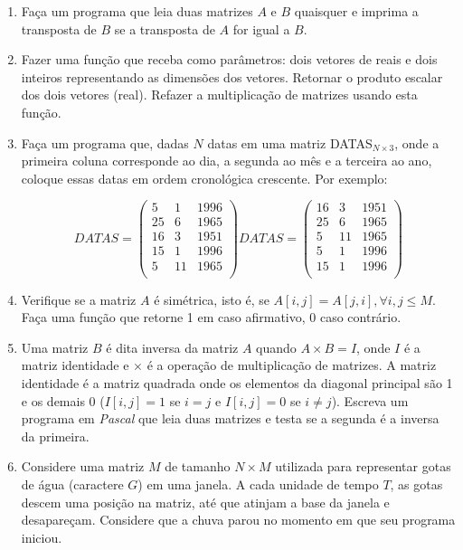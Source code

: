 \begin{enumerate}
 \item Faça um programa que leia duas matrizes $A$
 e $B$ quaisquer e imprima a transposta de  $B$ se a transposta de $A$
 for igual a $B$.



\item Fazer uma função que receba  como parâmetros:  dois  vetores de
   reais    e   dois   inteiros    representando   as    dimensões   dos
   vetores. Retornar o produto escalar dos dois vetores (real). 
   Refazer a multiplicação de matrizes usando esta função. 


\item Faça um programa que, dadas $N$ datas em uma
matriz DATAS$_{N\times3}$, onde a primeira coluna corresponde ao dia, a segunda ao
mês e a terceira ao ano, coloque essas datas em ordem cronológica
crescente. Por exemplo:

\[
DATAS=\left( \begin{array}{ccc}
5&1&1996\\
25&6&1965\\
16&3&1951\\
15&1&1996\\
5&11&1965\\
\end{array}
\right)
DATAS=\left( \begin{array}{ccc}
16&3&1951\\
25&6&1965\\
5&11&1965\\
5&1&1996\\
15&1&1996\\
\end{array}
\right)
\]


\item Verifique se a matriz $A$ \'e sim\'etrica, isto \'e, se $A[i,j]=A[j,i], \forall i, j \le M$.
Fa\c ca uma fun\c c\~ao que retorne 1 em caso afirmativo, 0 caso contr\'ario.

\item Uma matriz $B$ é dita inversa da matriz $A$ quando $A \times B = I$, 
onde $I$ é a matriz identidade e $\times$ é a operação de multiplicação
de matrizes. A matriz identidade é a matriz quadrada onde os elementos da 
diagonal principal são 1 e os demais 0 ($I[i,j] = 1$ se $i=j$ e 
$I[i,j] = 0$ se $i \neq j$).  Escreva um programa em \emph{Pascal} que 
leia duas matrizes e testa se a segunda é a inversa da primeira.





\item Considere uma matriz $M$ de tamanho $N \times M$
utilizada para representar gotas de água (caractere $G$) em uma
janela. A cada unidade de tempo $T$, as gotas descem uma posição na
matriz, até que atinjam a base da janela e desapareçam. Considere que
a chuva parou no momento em que seu programa iniciou.


\end{enumerate}
